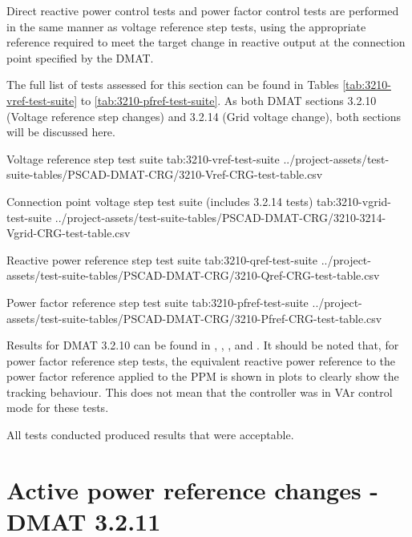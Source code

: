 \documentclass{../grid-link-report}
\newcommand{\projectassetsdir}{../project-assets}
\begin{document}
	Direct reactive power control tests and power factor control tests are performed in the same manner as voltage reference step tests, using the appropriate reference required to meet the target change in reactive output at the connection point specified by the \ac{DMAT}.
	
	The full list of tests assessed for this section can be found in Tables \ref{tab:3210-vref-test-suite} to \ref{tab:3210-pfref-test-suite}. As both DMAT sections 3.2.10 (Voltage reference step changes) and 3.2.14 (Grid voltage change), both sections will be discussed here.
	
	{
		\fontsize{7}{9}\selectfont
		\autoscaledlongtable
		{Voltage reference step test suite}
		{tab:3210-vref-test-suite}
		{\projectassetsdir/test-suite-tables/PSCAD-DMAT-CRG/3210-Vref-CRG-test-table.csv}
	}
	
	{
		\fontsize{7}{9}\selectfont
		\autoscaledlongtable
		{Connection point voltage step test suite (includes 3.2.14 tests)}
		{tab:3210-vgrid-test-suite}
		{\projectassetsdir/test-suite-tables/PSCAD-DMAT-CRG/3210-3214-Vgrid-CRG-test-table.csv}
	}
	
	
	{
		\fontsize{7}{9}\selectfont
		\autoscaledlongtable
		{Reactive power reference step test suite}
		{tab:3210-qref-test-suite}
		{\projectassetsdir/test-suite-tables/PSCAD-DMAT-CRG/3210-Qref-CRG-test-table.csv}
	}
	
	{
		\fontsize{7}{9}\selectfont
		\autoscaledlongtable
		{Power factor reference step test suite}
		{tab:3210-pfref-test-suite}
		{\projectassetsdir/test-suite-tables/PSCAD-DMAT-CRG/3210-Pfref-CRG-test-table.csv}
	}
	
	Results for DMAT 3.2.10 can be found in , , , and . It should be noted that, for power factor reference step tests, the equivalent reactive power reference to the power factor reference applied to the \ac{PPM} is shown in plots to clearly show the tracking behaviour. This does not mean that the controller was in VAr control mode for these tests.
	
	All tests conducted produced results that were acceptable.
	
	
	\section{Active power reference changes - DMAT 3.2.11}	
	\label{sec:pref-step-tests}
	
\end{document}
